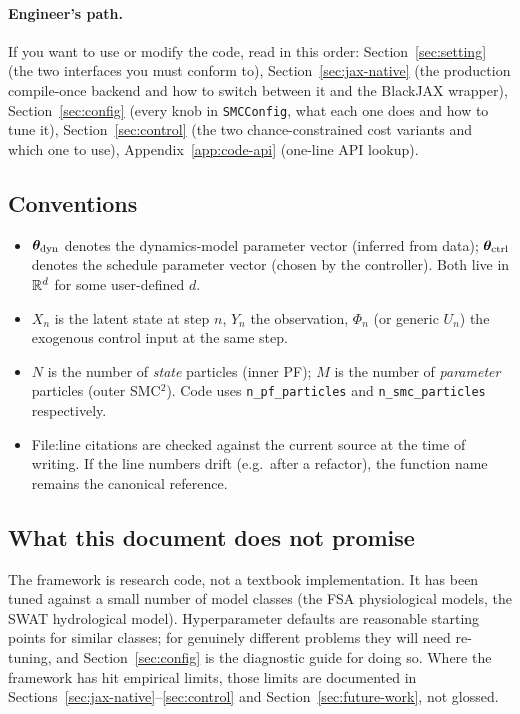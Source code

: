 \paragraph{Engineer's path.} If you want to use or modify the code,
read in this order:
Section~\ref{sec:setting} (the two interfaces you must conform to),
Section~\ref{sec:jax-native} (the production compile-once backend and
how to switch between it and the BlackJAX wrapper),
Section~\ref{sec:config} (every knob in \texttt{SMCConfig}, what each
one does and how to tune it), Section~\ref{sec:control} (the two
chance-constrained cost variants and which one to use),
Appendix~\ref{app:code-api} (one-line API lookup).

\subsection{Conventions}

\begin{itemize}
  \item $\bm{\theta}_{\rm dyn}$ denotes the dynamics-model parameter vector
        (inferred from data); $\bm{\theta}_{\rm ctrl}$ denotes the schedule
        parameter vector (chosen by the controller). Both live in
        $\mathbb{R}^d$ for some user-defined $d$.
  \item $X_n$ is the latent state at step $n$, $Y_n$ the observation,
        $\Phi_n$ (or generic $U_n$) the exogenous control input at the
        same step.
  \item $N$ is the number of \emph{state} particles (inner PF);
        $M$ is the number of \emph{parameter} particles
        (outer SMC$^2$). Code uses \texttt{n\_pf\_particles} and
        \texttt{n\_smc\_particles} respectively.
  \item File:line citations are checked against the current source at
        the time of writing. If the line numbers drift (e.g.\ after a
        refactor), the function name remains the canonical reference.
\end{itemize}

\subsection{What this document does not promise}

The framework is research code, not a textbook implementation. It has
been tuned against a small number of model classes (the FSA
physiological models, the SWAT hydrological model). Hyperparameter
defaults are reasonable starting points for similar classes; for
genuinely different problems they will need re-tuning, and
Section~\ref{sec:config} is the diagnostic guide for doing so. Where
the framework has hit empirical limits, those limits are documented in
Sections~\ref{sec:jax-native}--\ref{sec:control} and
Section~\ref{sec:future-work}, not glossed.
